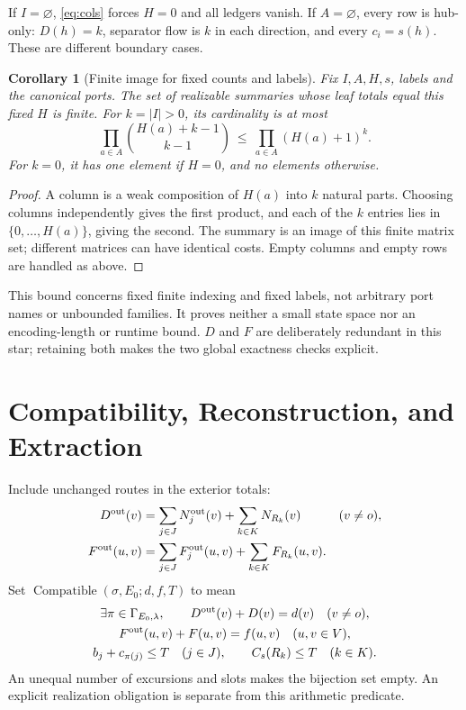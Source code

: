 \documentclass[11pt]{article}
\newtheorem{corollary}[definition]{Corollary}
\theoremstyle{remark}
\newcommand{\Compat}{\operatorname{Compatible}}
\begin{document}
If $I=\varnothing$, \eqref{eq:cols} forces $H=0$ and all ledgers vanish.
If $A=\varnothing$, every row is hub-only: $D(h)=k$, separator flow is $k$
in each direction, and every $c_i=s(h)$. These are different boundary cases.

\begin{corollary}[Finite image for fixed counts and labels]\label{cor:finite}
Fix $I,A,H,s$, labels and the canonical ports. The set of realizable summaries
whose leaf totals equal this fixed $H$ is finite.
For $k=|I|>0$, its cardinality is at most
\[
 \prod_{a\in A}\binom{H(a)+k-1}{k-1}
 \ \le\ \prod_{a\in A}(H(a)+1)^k.
\]
For $k=0$, it has one element if $H=0$, and no elements otherwise.
\end{corollary}
\begin{proof}
A column is a weak composition of $H(a)$ into $k$ natural parts. Choosing
columns independently gives the first product, and each of the $k$ entries
lies in $\{0,\ldots,H(a)\}$, giving the second. The summary is an image of
this finite matrix set; different matrices can have identical costs. Empty
columns and empty rows are handled as above.
\end{proof}
This bound concerns fixed finite indexing and fixed labels, not arbitrary
port names or unbounded families. It proves neither a small state space nor
an encoding-length or runtime bound. $D$ and $F$ are deliberately redundant
in this star; retaining both makes the two global exactness checks explicit.

\section{Compatibility, Reconstruction, and Extraction}
\label{sec:main}

Include unchanged routes in the exterior totals:
\begin{align*}
 D^{\rm out}(v)&=\sum_{j\in J}N_j^{\rm out}(v)+\sum_{k\in K}N_{R_k}(v)
 &&(v\ne o),\\
 F^{\rm out}(u,v)&=\sum_{j\in J}F_j^{\rm out}(u,v)+\sum_{k\in K}F_{R_k}(u,v).
\end{align*}
Set $\Compat(\sigma,E_0;d,f,T)$ to mean
\begin{equation}\label{eq:compat}
 \begin{gathered}
 \exists\pi\in\Gamma_{E_0,\lambda},\qquad
 D^{\rm out}(v)+D(v)=d(v)\quad(v\ne o),\\
 F^{\rm out}(u,v)+F(u,v)=f(u,v)\quad(u,v\in V),\\
 b_j+c_{\pi(j)}\le T\quad(j\in J),\qquad
 C_s(R_k)\le T\quad(k\in K).
 \end{gathered}
\end{equation}
An unequal number of excursions and slots makes the bijection set empty.
An explicit realization obligation is separate from this arithmetic predicate.
\end{document}
